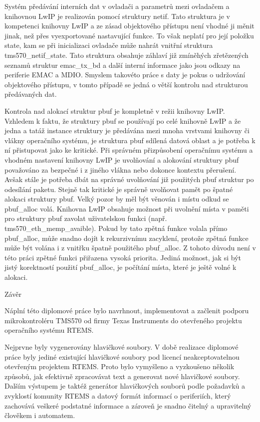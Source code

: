 Systém předávání interních dat v ovladači a parametrů mezi ovladačem a knihovnou LwIP je realizován pomocí struktury netif.
Tato struktura je v kompetenci knihovny LwIP a ze zásad objektového přístupu není vhodné ji měnit jinak, než přes vyexportované nastavující funkce.
To však neplatí pro její položku state, kam se při inicializaci ovladače může nahrát vnitřní struktura tms570\_netif\_state.
Tato struktura obsahuje záhlaví již zmíněhých zřetězených seznamů struktur emac\_tx\_bd a další interní informace jako jsou odkazy na periferie EMAC a MDIO.
Smyslem takovéto práce s daty je pokus o udržování objektového přístupu, v tomto případě se jedná o větší kontrolu nad strukturou předávaných dat.

Kontrola nad alokací struktur pbuf je kompletně v režii knihovny LwIP.
Vzhledem k faktu, že struktury pbuf se používají po celé knihovně LwIP a že jedna a tatáž instance struktury je předávána mezi mnoha vrstvami knihovny či vlákny operačního systému, je struktura pbuf sdílená datová oblast a je potřeba k ní přistupovat jako ke kritické.
Při správném přizpůsobení operačnímu systému a vhodném nastavení knihovny LwIP je uvolňování a alokování struktury pbuf považováno za bezpečné i z jiného vlákna nebo dokonce kontextu přerušení.
Avšak stále je potřeba dbát na správné uvolňování již použitých pbuf struktur po odesílání paketu.
Stejně tak kritické je správně uvolňovat pamět po špatné alokaci struktury pbuf.
Velký pozor by měl být věnován i místu odkud se pbuf\_alloc volá.
Knihovna LwIP obsahuje možnost při uvolnění místa v paměti pro struktury pbuf zavolat uživatelskou funkci (např. tms570\_eth\_memp\_avaible).{}
Pokud by tato zpětná funkce volala přímo pbuf\_alloc, může snadno dojít k rekurzivnímu zacyklení, protože zpětná funkce může být volána i z vnitřku špatně použitého pbuf\_alloc.
Z tohoto důvodu není v této práci zpětné funkci přiřazena vysoká priorita.
Jediná možnost, jak si být jistý korektností použití pbuf\_alloc, je počítání místa, které je ještě volné k alokaci.

\chap Závěr

Náplní této diplomové práce bylo navrhnout, implementovat a začlenit podporu mikrokontroléru TMS570 od firmy Texas Instruments do otevřeného projektu operačního systému RTEMS.

\medskip

Nejprvne byly vygenerovány hlavičkové soubory.
V době realizace diplomové práce byly jediné existující hlavičkové soubory pod licencí neakceptovatelnou otevřeným projektem RTEMS.
Proto bylo vymyšleno a vyzkoušeno několik způsobů, jak efektivně zpracovávat text a generovat nové hlavičkové soubory.
Dalším výstupem je taktéž generátor hlavičkových souborů podle požadavků a zvyklostí komunity RTEMS a datový formát informací o periferiích, který zachovává veškeré podstatné informace a zároveň je snadno čitelný a upravitelný člověkem i automatem.

